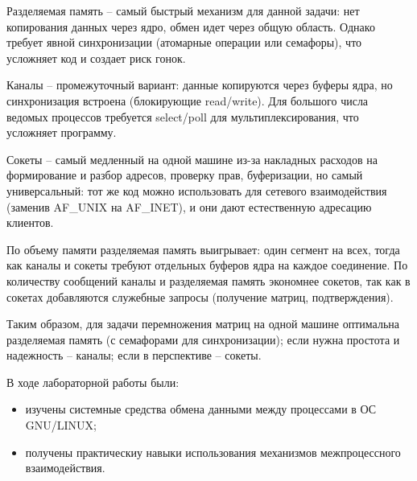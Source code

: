 Разделяемая память -- самый быстрый механизм для данной задачи: нет копирования данных через ядро, обмен идет через общую область. Однако требует явной синхронизации (атомарные операции или семафоры), что усложняет код и создает риск гонок.

Каналы -- промежуточный вариант: данные копируются через буферы ядра, но синхронизация встроена (блокирующие read/write). Для большого числа ведомых процессов требуется select/poll для мультиплексирования, что усложняет программу.

Сокеты -- самый медленный на одной машине из-за накладных расходов на формирование и разбор адресов, проверку прав, буферизации, но самый  универсальный: тот же код можно использовать для сетевого взаимодействия (заменив AF\_UNIX на AF\_INET), и они дают естественную адресацию клиентов.

По объему памяти разделяемая память выигрывает: один сегмент на всех, тогда как каналы и сокеты требуют отдельных буферов ядра на каждое соединение.
По количеству сообщений каналы и разделяемая память экономнее сокетов, так как в сокетах добавляются служебные запросы (получение матриц, подтверждения).

Таким образом, для задачи перемножения матриц на одной машине оптимальна разделяемая память (с семафорами для синхронизации); если нужна простота и надежность -- каналы; если в перспективе -- сокеты.


В ходе лабораторной работы были:  
\begin{itemize}
	\item изучены системные средства обмена данными между процессами в ОС GNU/LINUX;
	\item получены практическиу навыки использования механизмов межпроцессного взаимодействия.
\end{itemize}


